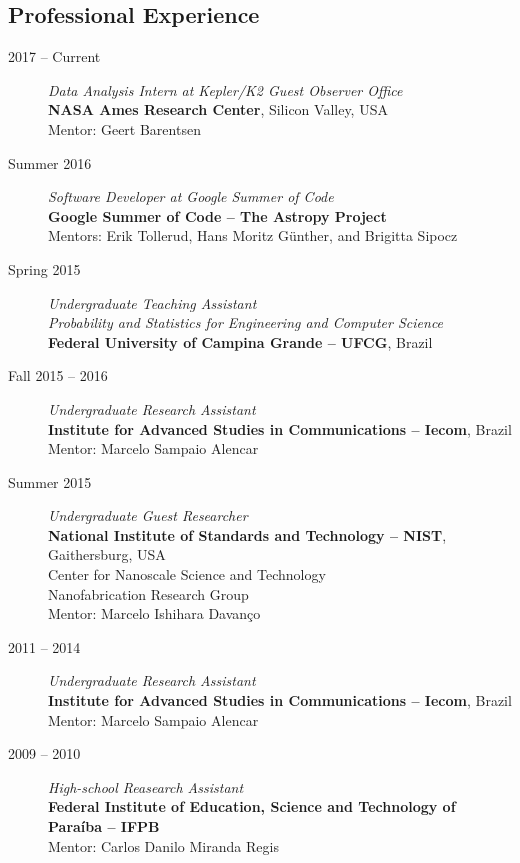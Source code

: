 \documentclass[10pt]{article}
\begin{document}
\begin{titlepage}
\section{Professional Experience}
\begin{description}
\item[2017 -- Current] \emph{Data Analysis Intern at Kepler/K2 Guest Observer Office}
\\\textbf{NASA Ames Research Center}, Silicon Valley, USA
\\Mentor: Geert Barentsen
\item[Summer 2016] \emph{Software Developer at Google Summer of Code}
\\\textbf{Google Summer of Code -- The Astropy Project}
\\Mentors: Erik Tollerud, Hans Moritz G\"unther, and Brigitta Sipocz
\item[Spring 2015] \emph{Undergraduate Teaching Assistant}
\\\emph{Probability and Statistics for Engineering and Computer Science}
\\\textbf{Federal University of Campina Grande -- UFCG}, Brazil
\item[Fall 2015 -- 2016] \emph{Undergraduate Research Assistant}
\\\textbf{Institute for Advanced Studies in Communications -- Iecom}, Brazil
\\Mentor: Marcelo Sampaio Alencar
\item[Summer 2015] \emph{Undergraduate Guest Researcher}
\\\textbf{National Institute of Standards and Technology -- NIST}, Gaithersburg, USA
\\Center for Nanoscale Science and Technology
\\Nanofabrication Research Group
\\Mentor: Marcelo Ishihara Davan\c co
\item[2011 -- 2014] \emph{Undergraduate Research Assistant}
\\\textbf{Institute for Advanced Studies in Communications -- Iecom}, Brazil
\\Mentor: Marcelo Sampaio Alencar
\item[2009 -- 2010] \emph{High-school Reasearch Assistant}
\\\textbf{Federal Institute of Education, Science and Technology of Para\'iba -- IFPB}
\\Mentor: Carlos Danilo Miranda Regis
\end{description}


\end{titlepage}
\end{document}
